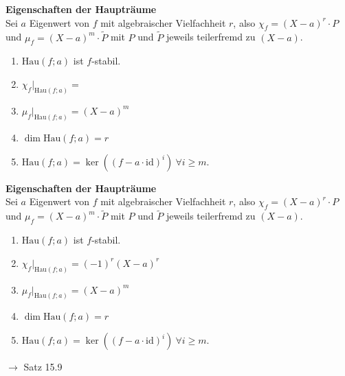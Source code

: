 \documentclass[11pt]{article}
\renewcommand{\cite}[1]{\par\bigskip\hfill{\color{gray}\tiny\(\to\) #1}}
\renewcommand{\geq}{\geqslant}
\newcommand{\id}{\mathrm{id}}
\newenvironment{field}{}{\newpage}
\newif\ifnote
\newenvironment{note}{\notetrue}{\notefalse}
\begin{document}
\begin{note}
    \begin{field}
        \textbf{Eigenschaften der Haupträume}\\
        Sei $a$ Eigenwert von $f$ mit algebraischer Vielfachheit $r$, also $\chi_f = (X-a)^r\cdot P$ und $\mu_f = (X-a)^m\cdot \tilde P$ mit $P$ und $\tilde P$ jeweils teilerfremd zu $(X-a)$.
        \begin{enumerate}[(1)]
            \item $\text{Hau}(f;a)$ ist $f$-stabil.
            \item $\chi_f\vert_{\text{Hau}(f;a)} = \phantom{(-1)^r(X-a)^r}$
            \item $\mu_f\vert_{\text{Hau}(f;a)} = (X-a)^m$
            \item $\dim \text{Hau}(f;a) = r$
            \item $\text{Hau}(f;a)= \ker((f- a\cdot \id)^i) \ \forall i \geq m$.
        \end{enumerate}
    \end{field}
    \begin{field}
        \textbf{Eigenschaften der Haupträume}\\
        Sei $a$ Eigenwert von $f$ mit algebraischer Vielfachheit $r$, also $\chi_f = (X-a)^r\cdot P$ und $\mu_f = (X-a)^m\cdot \tilde P$ mit $P$ und $\tilde P$ jeweils teilerfremd zu $(X-a)$.
        \begin{enumerate}[(1)]
            \item $\text{Hau}(f;a)$ ist $f$-stabil.
            \item $\chi_f\vert_{\text{Hau}(f;a)} = (-1)^r(X-a)^r$
            \item $\mu_f\vert_{\text{Hau}(f;a)} = (X-a)^m$
            \item $\dim \text{Hau}(f;a) = r$
            \item $\text{Hau}(f;a)= \ker((f- a\cdot \id)^i) \ \forall i \geq m$.
        \end{enumerate}
        \cite{Satz 15.9}
    \end{field}


\end{note}
\end{document}
